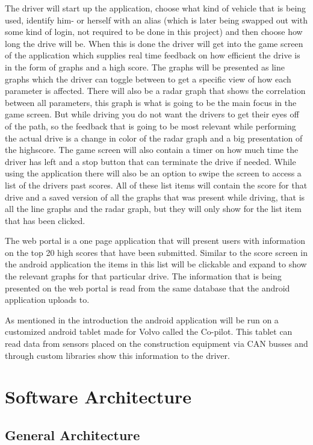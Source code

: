 \documentclass{article}
\begin{document}
The driver will start up the application, choose what kind of vehicle that is being used, identify him- or herself with an alias (which is later being swapped out with some kind of login, not required to be done in this project) and then choose how long the drive will be. When this is done the driver will get into the game screen of the application which supplies real time feedback on how efficient the drive is in the form of graphs and a high score. The graphs will be presented as line graphs which the driver can toggle between to get a specific view of how each parameter is affected. There will also be a radar graph that shows the correlation between all parameters, this graph is what is going to be the main focus in the game screen. But while driving you do not want the drivers to get their eyes off of the path, so the feedback that is going to be most relevant while performing the actual drive is a change in color of the radar graph and a big presentation of the highscore. The game screen will also contain a timer on how much time the driver has left and a stop button that can terminate the drive if needed. While using the application there will also be an option to swipe the screen to access a list of the drivers past scores. All of these list items will contain the score for that drive and a saved version of all the graphs that was present while driving, that is all the line graphs and the radar graph, but they will only show for the list item that has been clicked.

The web portal is a one page application that will present users with information on the top 20 high scores that have been submitted. Similar to the score screen in the android application the items in this list will be clickable and expand to show the relevant graphs for that particular drive. The information that is being presented on the web portal is read from the same database that the android application uploads to.

As mentioned in the introduction the android application will be run on a customized android tablet made for Volvo called the Co-pilot. This tablet can read data from sensors placed on the construction equipment via CAN busses and through custom libraries show this information to the driver. 

\section{Software Architecture}
\subsection{General Architecture}
\end{document}
